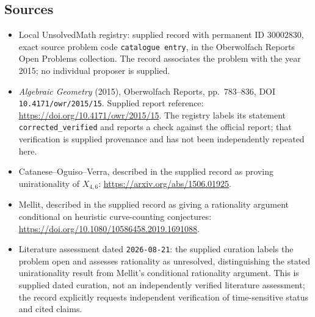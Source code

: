 \documentclass[11pt]{article}
\begin{document}
\subsection{Sources}
\begin{itemize}
\item Local UnsolvedMath registry: supplied record with permanent ID \(30002830\), exact source problem code \texttt{catalogue entry}, in the Oberwolfach Reports Open Problems collection. The record associates the problem with the year 2015; no individual proposer is supplied.
\item \emph{Algebraic Geometry} (2015), Oberwolfach Reports, pp.\ 783--836, DOI \texttt{10.4171/owr/2015/15}. Supplied report reference: \url{https://doi.org/10.4171/owr/2015/15}. The registry labels its statement \texttt{corrected\_verified} and reports a check against the official report; that verification is supplied provenance and has not been independently repeated here.
\item Catanese--Oguiso--Verra, described in the supplied record as proving unirationality of \(X_{4,6}\): \url{https://arxiv.org/abs/1506.01925}.
\item Mellit, described in the supplied record as giving a rationality argument conditional on heuristic curve-counting conjectures: \url{https://doi.org/10.1080/10586458.2019.1691088}.
\item Literature assessment dated \texttt{2026-08-21}: the supplied curation labels the problem open and assesses rationality as unresolved, distinguishing the stated unirationality result from Mellit's conditional rationality argument. This is supplied dated curation, not an independently verified literature assessment; the record explicitly requests independent verification of time-sensitive status and cited claims.
\end{itemize}
\end{document}

